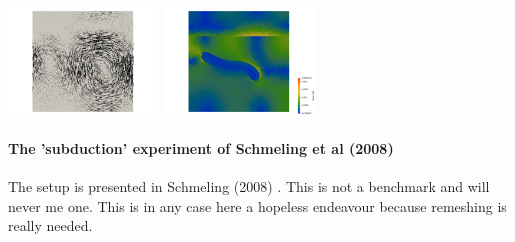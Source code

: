 \begin{center}
\includegraphics[width=4cm]{python_codes/fieldstone_93/results_exp5/vel200}
\includegraphics[width=4cm]{python_codes/fieldstone_93/results_exp5/sr200}
\end{center} 



\paragraph{The 'subduction' experiment of Schmeling et al (2008)}

The setup is presented in Schmeling \etal (2008) \cite{scbe08}. 
This is not a benchmark and will never me one. This is in any case here 
a hopeless endeavour because remeshing is really needed. 

